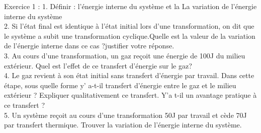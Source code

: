 \documentclass[12pt, french]{article}
\begin{document}
\begin{center}
\end{center}


   \begin{Box2}{Exercice 1 : }
   1. Définir :  l'énergie interne du système  et la La variation de l'énergie interne du système
     \\2. Si l’état final est identique à l'état initial lors d’une transformation, on dit que le système a subit une transformation cyclique.Quelle est la valeur de la variation de l’énergie interne dans ce cas ?justifier votre réponse.
\\3. Au cours d’une transformation, un gaz reçoit une énergie de 100J du milieu extérieur. Quel est l’effet de ce transfert d’énergie sur le gaz?
\\4. Le gaz revient à son état initial sans transfert d’énergie par travail. Dans cette étape, sous quelle forme y'
a-t-il transfert d’énergie entre le gaz et le milieu extérieur ? Expliquer qualitativement ce transfert. Y'a t-il
un avantage pratique à ce transfert ?
\\5. Un système reçoit au cours d’une transformation 50J par travail et cède 70J par transfert thermique. Trouver la
variation de l’énergie interne du système. 

   \end{Box2}
\end{document}
